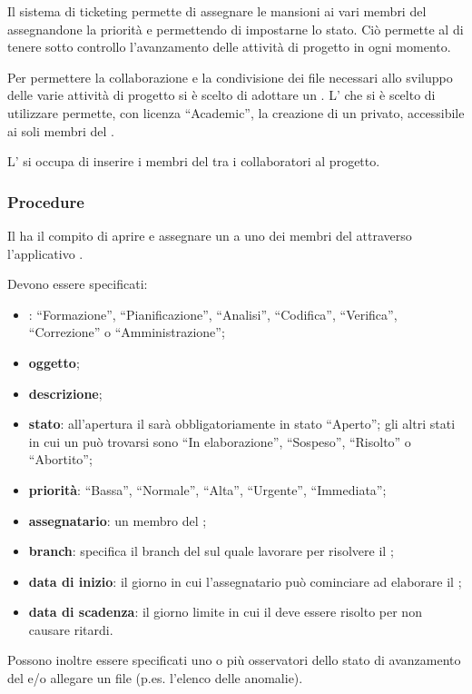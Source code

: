 \documentclass[a4paper, titlepage]{article}
\begin{document}
Il sistema di ticketing permette di assegnare le mansioni ai vari membri del  assegnandone la priorità e permettendo di impostarne lo stato. Ciò permette al  di tenere sotto controllo l'avanzamento delle attività di progetto in ogni momento.

Per permettere la collaborazione e la condivisione dei file necessari allo sviluppo delle varie attività di progetto si è scelto di adottare un . L' che si è scelto di utilizzare permette, con licenza ``Academic'', la creazione di un  privato, accessibile ai soli membri del .

L' si occupa di inserire i membri del  tra i collaboratori al progetto.

\subsubsection{Procedure}

Il  ha il compito di aprire e assegnare un  a uno dei membri del  attraverso l'applicativo .

Devono essere specificati:
\begin{itemize}
	\item \textbf{}: ``Formazione'', ``Pianificazione'', ``Analisi'', ``Codifica'', ``Verifica'', ``Correzione'' o ``Amministrazione'';
	\item \textbf{oggetto};
	\item \textbf{descrizione};
	\item \textbf{stato}: all'apertura il  sarà obbligatoriamente in stato ``Aperto''; gli altri stati in cui un  può trovarsi sono ``In elaborazione'', ``Sospeso'', ``Risolto'' o ``Abortito'';
	\item \textbf{priorità}: ``Bassa'', ``Normale'', ``Alta'', ``Urgente'', ``Immediata'';
	\item \textbf{assegnatario}: un membro del ;
	\item \textbf{branch}: specifica il branch del  sul quale lavorare per risolvere il ;
	\item \textbf{data di inizio}: il giorno in cui l'assegnatario può cominciare ad elaborare il ;
	\item \textbf{data di scadenza}: il giorno limite in cui il  deve essere risolto per non causare ritardi.
\end{itemize}
Possono inoltre essere specificati uno o più osservatori dello stato di avanzamento del  e/o allegare un file (p.es. l'elenco delle anomalie).
\end{document}
